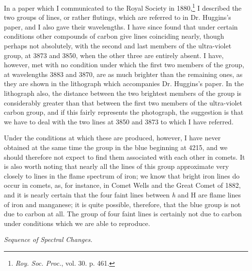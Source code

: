 \documentclass[a4paper, 12pt, oneside, polutonikogreek, english]{article}
\begin{document}
In a paper which I communicated to the Royal Society in 1880,\footnote{\emph{Roy. Soc. Proc.}, vol. 30. p. 461.} I described the two groups of lines, or rather flutings, which are referred to in Dr. Huggins's paper, and I also gave their wavelengths. I have since found that under certain conditions other compounds of carbon give lines coinciding nearly, though perhaps not absolutely, with the second and last members of the ultra-violet group, at 3873 and 3850, when the other three are entirely absent. I have, however, met with no condition under which the first two members of the group, at wavelengths 3883 and 3870, are as much brighter than the remaining ones, as they are shown in the lithograph which accompanies Dr. Huggins's paper. In the lithograph also, the distance between the two brightest members of the group is considerably greater than that between the first two members of the ultra-violet carbon group, and if this fairly represents the photograph, the suggestion is that we have to deal with the two lines at 3850 and 3873 to which I have referred.

Under the conditions at which these are produced, however, I have never obtained at the same time the group in the blue beginning at 4215, and we should therefore not expect to find them associated with each other in comets. It is also worth noting that nearly all the lines of this group approximate very closely to lines in the flame spectrum of iron; we know that bright iron lines do occur in comets, as, for instance, in Comet Wells and the Great Comet of 1882, and it is nearly certain that the four faint lines between \emph{h} and H are flame lines of iron and manganese; it is quite possible, therefore, that the blue group is not due to carbon at all. The group of four faint lines is certainly not due to carbon under conditions which we are able to reproduce.

\emph{Sequence of Spectral Changes.}
\end{document}
